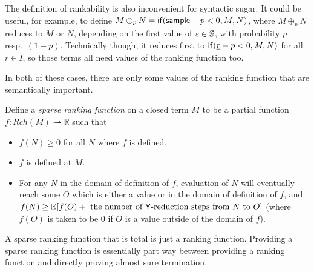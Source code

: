 The definition of rankability is also inconvenient for syntactic sugar. It could be useful, for example, to define $M \oplus_p N = \mathsf{if}(\mathsf{sample} - p < 0, M, N)$, where $M \oplus_p N$ reduces to $M$ or $N$, depending on the first value of $s \in {\mathbb{S}}$, with probability $p$ resp.~$(1-p)$. Technically though, it reduces first to $\mathsf{if}(\underline r - p < 0, M, N)$ for all $r \in I$, so those terms all need values of the ranking function too.

In both of these cases, there are only some values of the ranking function that are semantically important. 
\begin{definition}
Define a \emph{sparse ranking function} on a closed term $M$ to be a partial function $f : Rch(M) \rightharpoonup \mathbb R$ such that
\begin{itemize}
    \item $f(N) \geq 0$ for all $N$ where $f$ is defined.
    \item $f$ is defined at $M$.
    \item For any $N$ in the domain of definition of $f$, evaluation of $N$ will eventually  reach some $O$ which is either a value or in the domain of definition of $f$, and $f(N) \geq \mathbb E[f(O) + \text{ the number of $\mathsf{Y}$-reduction steps from $N$ to $O$}]$ (where $f(O)$ is taken to be 0 if $O$ is a value outside of the domain of $f$).
\end{itemize}
\end{definition}
A sparse ranking function that is total is just a ranking function. Providing a sparse ranking function is essentially part way between providing a ranking function and directly proving almost sure termination.

